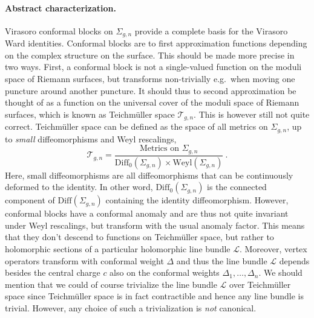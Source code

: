 \documentclass[12pt,a4paper]{article}
\newcommand{\be}{\begin{equation}}
\newcommand{\ee}{\end{equation}}
\newcommand\Diff{\text{Diff}}
\begin{document}
\paragraph{Abstract characterization.} Virasoro conformal blocks on $\Sigma_{g,n}$ provide a complete basis for the Virasoro Ward identities. Conformal blocks are to first approximation functions depending on the complex structure on the surface.
This should be made more precise in two ways. First, a conformal block is not a single-valued function on the moduli space of Riemann surfaces, but transforms non-trivially e.g.\ when moving one puncture around another puncture. It should thus to second approximation be thought of as a function on the universal cover of the moduli space of Riemann surfaces, which is known as Teichm\"uller space $\mathcal{T}_{g,n}$. This is however still not quite correct. Teichm\"uller space can be defined as the space of all metrics on $\Sigma_{g,n}$, up to \emph{small} diffeomorphisms and Weyl rescalings,
\be  
    \mathcal{T}_{g,n}=\frac{\text{Metrics on }\Sigma_{g,n}}{\Diff_0(\Sigma_{g,n}) \times \text{Weyl}(\Sigma_{g,n})}\ . \label{eq:definition Teichmuller space}
\ee
Here, small diffeomorphisms are all diffeomorphisms that can be continuously deformed to the identity. In other word, $\Diff_0(\Sigma_{g,n})$ is the connected component of $\Diff(\Sigma_{g,n})$ containing the identity diffeomorphism. However, conformal blocks have a conformal anomaly and are thus not quite invariant under Weyl rescalings, but transform with the usual anomaly factor.
This means that they don't descend to functions on Teichm\"uller space, but rather to holomorphic sections of a particular holomorphic line bundle $\mathscr{L}$. Moreover, vertex operators transform with conformal weight $\Delta$ and thus the line bundle $\mathscr{L}$ depends besides the central charge $c$ also on the conformal weights $\Delta_1,\dots,\Delta_n$. We should mention that we could of course trivialize the line bundle $\mathscr{L}$ over Teichm\"uller space since Teichm\"uller space is in fact contractible and hence any line bundle is trivial. However, any choice of such a trivialization is \emph{not} canonical.
\end{document}
